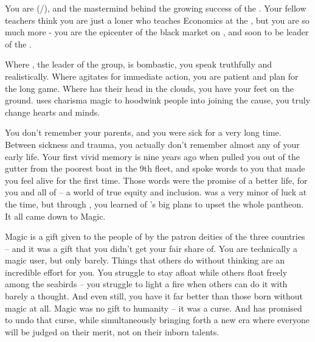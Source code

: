 \documentclass[char]{GL2020}
\begin{document}
\name{\cChupSecond{}}

You are \cChupSecond{\full} (\cChupSecond{\they}/\cChupSecond{\them}), and the mastermind behind the growing success of the \pGoaties{}. Your fellow teachers think you are just a loner who teaches Economics at the \pSchool{}, but you are so much more - you are the epicenter of the black market on \pEarth{}, and soon to be leader of the \pGoaties{}.

Where \cChupLeader{}, the leader of the group, is bombastic, you speak truthfully and realistically. Where \cChupLeader{} agitates for immediate action, you are patient and plan for the long game. Where \cChupLeader{} has their head in the clouds, you have your feet on the ground. \cChupLeader{} uses charisma magic to hoodwink people into joining the cause, you truly change hearts and minds.

You don’t remember your parents, and you were sick for a very long time. Between sickness and trauma, you actually don’t remember almost any of your early life. Your first vivid memory is nine years ago when \cChupLeader{} pulled you out of the gutter from the poorest boat in the 9th fleet, and spoke words to you that made you feel alive for the first time. Those words were the promise of a better life, for you and all of \pEarth{} -- a world of true equity and inclusion. \cGenesis{} was a very minor \cGenesis{\Deity} of luck at the time, but through \cChupLeader{}, you learned of \cGenesis{}’s big plans to upset the whole pantheon. It all came down to Magic. 

Magic is a gift given to the people of \pEarth{} by the patron deities of the three countries -- and it was a gift that you didn’t get your fair share of. You are technically a magic user, but only barely. Things that others do without thinking are an incredible effort for you. You struggle to stay afloat while others float freely among the seabirds -- you struggle to light a fire when others can do it with barely a thought. And even still, you have it far better than those born without magic at all. Magic was no gift to humanity -- it was a curse. And \cGenesis{} has promised to undo that curse, while simultaneously bringing forth a new era where everyone will be judged on their merit, not on their inborn talents.
\end{document}
